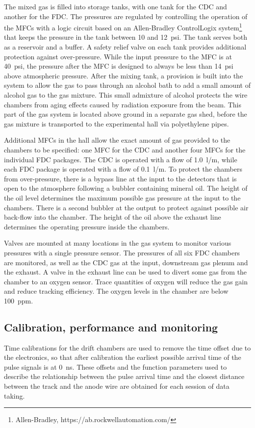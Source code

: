 The mixed gas is filled into storage tanks, with one tank for the CDC and another for the FDC. The pressures are
regulated by controlling the operation of the MFCs with a logic circuit based on an Allen-Bradley ControlLogix system\footnote{Allen-Bradley, https://ab.rockwellautomation.com/}
 that keeps
the pressure in the tank between 10 and 12~psi. The tank serves both as a reservoir and a buffer.
A safety relief valve on each tank
provides additional protection against over-pressure. While the input pressure to the MFC is at 40~psi, the pressure after
the MFC is designed to always be less than 14~psi above atmospheric pressure. After the mixing tank, a provision is
built into the system to allow the gas to pass through an alcohol bath to add a small amount of alcohol gas to the gas mixture.
This small admixture of alcohol protects the wire chambers from aging effects caused by radiation exposure from the beam.
This part of the gas system is located above ground in a separate gas shed, before the gas mixture is transported
to the experimental hall via polyethylene pipes.

Additional MFCs in the hall allow the exact amount of gas provided to the chambers to be specified: one MFC for the CDC and another 
four MFCs for the individual FDC packages. The CDC is operated with a flow of 1.0~l/m, while each FDC package is operated with
a flow of 0.1~l/m. To protect the chambers from over-pressure, there is a bypass line at the input to the detectors that
is open to the atmosphere following a bubbler containing mineral oil. The height of the oil level determines the maximum possible gas pressure at
the input to the chambers. There is a second bubbler at the output to protect against possible air back-flow into
the chamber. The height of the oil above the exhaust line determines the operating pressure inside the chambers.

Valves are mounted at many locations in the gas system to monitor various pressures with a single pressure sensor. The pressures of all six FDC chambers are monitored, as well as the CDC gas at the input, downstream gas plenum and the exhaust. 
A valve in the exhaust line can be used to divert some gas from the chamber to an oxygen sensor. Trace quantities of oxygen will reduce the gas gain and reduce tracking efficiency. The oxygen levels in the chamber are below 100~ppm.

\subsection{Calibration, performance and monitoring \label{sec:dccalib}}
Time calibrations for the drift chambers are used to remove the time offset due to the electronics, so that after calibration the earliest possible arrival time of the pulse signals is at 0~ns. These offsets and the function parameters used to describe the relationship between the pulse arrival time and the closest distance between the track and the anode wire are obtained for each session of data taking. 

